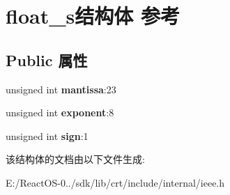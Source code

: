 \hypertarget{structfloat__s}{}\section{float\+\_\+s结构体 参考}
\label{structfloat__s}
\subsection*{Public 属性}
\begin{DoxyCompactItemize}
\item 
\mbox{\label{structfloat__s_ad84af47ebf6102ab8d9f9e77a8f0ecb9}} 
unsigned int {\bfseries mantissa}\+:23
\item 
\mbox{\label{structfloat__s_a8bb934388657f3abaca02fce7fd31e26}} 
unsigned int {\bfseries exponent}\+:8
\item 
\mbox{\label{structfloat__s_a95008b17bae16c2dfd9448e509174b2d}} 
unsigned int {\bfseries sign}\+:1
\end{DoxyCompactItemize}


该结构体的文档由以下文件生成\+:\begin{DoxyCompactItemize}
\item 
E\+:/\+React\+O\+S-\/0../sdk/lib/crt/include/internal/ieee.\+h\end{DoxyCompactItemize}
